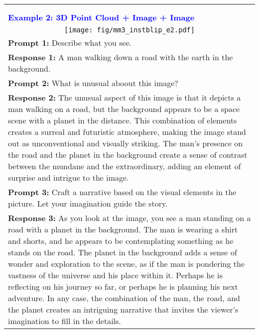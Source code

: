 \documentclass{article}
\newcommand{\methodname}{{\scshape Vit-lens}\xspace}
\begin{document}
\begin{table*}[h!]
\begin{minipage}{1.0\columnwidth}
\begin{tcolorbox}[colback=white,colframe=blue!75!black,title={\bf InstructBLIP w/ \methodname, Three Multimodal Inputs.}]
\begin{tabular}{p{} }
\\
\hrulefill  \\  
\\ 
\textcolor{blue}{ {\bf Example 2: 3D Point Cloud + Image + Image} }  \\
 \multicolumn{1}{c}{\texttt{[image: fig/mm3\_instblip\_e2.pdf]}} \\
{\bf Prompt 1:} Describe what you see.  \\
{\bf Response 1:} A man walking down a road with the earth in the background.  \\
{\bf Prompt 2:} What is unusual aboout this image?  \\
{\bf Response 2:} The unusual aspect of this image is that it depicts a man walking on a road, but the background appears to be a space scene with a planet in the distance. This combination of elements creates a surreal and futuristic atmosphere, making the image stand out as unconventional and visually striking. The man's presence on the road and the planet in the background create a sense of contrast between the mundane and the extraordinary, adding an element of surprise and intrigue to the image. \\
{\bf Prompt 3:} Craft a narrative based on the visual elements in the picture. Let your imagination guide the story. \\
{\bf Response 3:} As you look at the image, you see a man standing on a road with a planet in the background. The man is wearing a shirt and shorts, and he appears to be contemplating something as he stands on the road. The planet in the background adds a sense of wonder and exploration to the scene, as if the man is pondering the vastness of the universe and his place within it. Perhaps he is reflecting on his journey so far, or perhaps he is planning his next adventure. In any case, the combination of the man, the road, and the planet creates an intriguing narrative that invites the viewer's imagination to fill in the details.
\end{tabular}
\end{tcolorbox}
\vspace{-2mm}
\end{minipage}
\end{table*}

\clearpage
\end{document}
